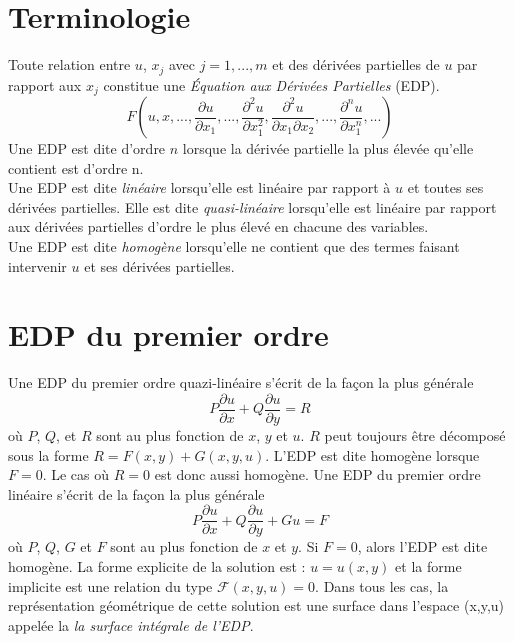 
\chapter{Terminologie}
Toute relation entre $u$, $x_j$ avec $j=1,...,m$ et des dérivées partielles de $u$ par rapport aux $x_j$ constitue une \emph{Équation aux Dérivées Partielles} (EDP).
\begin {equation}
F\left( u,x,...,\frac{\partial u}{\partial x_1},...,\frac{\partial ^2 u}{\partial x_{1}^{2}},\frac{\partial ^2 u}{\partial x_1 \partial x_2},...,\frac{\partial ^n u}{\partial x_{1}^{n}},... \right)
\end{equation}
Une EDP est dite d'ordre $n$ lorsque la dérivée partielle la plus élevée qu'elle contient est d'ordre n.\\
Une EDP est dite \emph{linéaire} lorsqu'elle est linéaire par rapport à $u$ et toutes ses dérivées partielles. Elle est dite \emph{quasi-linéaire} lorsqu'elle est linéaire par rapport aux dérivées partielles d'ordre le plus élevé en chacune des variables.\\
Une EDP est dite \emph{homogène} lorsqu'elle ne contient que des termes faisant intervenir $u$ et ses dérivées partielles.
\chapter{EDP du premier ordre}
Une EDP du premier ordre quazi-linéaire s'écrit de la façon la plus générale
\begin{equation}
P\frac{\partial u}{\partial x} + Q \frac{\partial u}{\partial y} = R
\label{eq:def-EDP-1er-ordre}
\end{equation}
où $P$, $Q$, et $R$ sont au plus fonction de $x$, $y$ et $u$. $R$ peut toujours être décomposé sous la forme $R=F(x,y) + G(x,y,u)$.	 L'EDP est dite homogène lorsque $F=0$. Le cas où $R=0$ est donc aussi homogène. 
Une EDP du premier ordre linéaire s'écrit de la façon la plus générale
\begin{equation}
P\frac{\partial u}{\partial x} + Q \frac{\partial u}{\partial y} + Gu = F
\end{equation}
où $P$, $Q$, $G$ et $F$ sont au plus fonction de $x$ et $y$. Si $F=0$, alors l'EDP est dite homogène. La forme explicite de la solution est : $u=u(x,y)$ et la forme implicite est une relation du type $\mathcal{F}(x,y,u)=0$. Dans tous les cas, la représentation géométrique de cette solution est une surface dans l'espace (x,y,u) appelée la \emph{la surface intégrale de l'EDP}.
